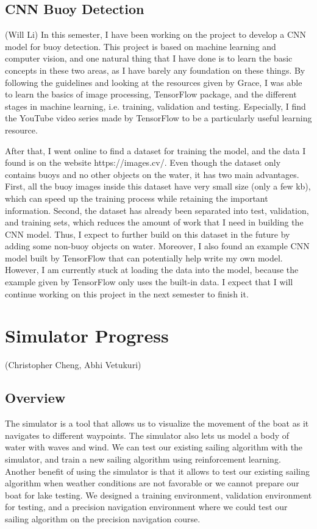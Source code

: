 \documentclass{article}
\begin{document}
\subsection{CNN Buoy Detection}
(Will Li)
\newline
In this semester, I have been working on the project to develop a CNN model for buoy detection. This project is based on machine learning and computer vision, and one natural thing that I have done is to learn the basic concepts in these two areas, as I have barely any foundation on these things. By following the guidelines and looking at the resources given by Grace, I was able to learn the basics of image processing, TensorFlow package, and the different stages in machine learning, i.e. training, validation and testing. Especially, I find the YouTube video series made by TensorFlow to be a particularly useful learning resource.

After that, I went online to find a dataset for training the model, and the data I found is on the website https://images.cv/. Even though the dataset only contains buoys and no other objects on the water, it has two main advantages. First, all the buoy images inside this dataset have very small size (only a few kb), which can speed up the training process while retaining the important information. Second, the dataset has already been separated into test, validation, and training sets, which reduces the amount of work that I need in building the CNN model. Thus, I expect to further build on this dataset in the future by adding some non-buoy objects on water. Moreover, I also found an example CNN model built by TensorFlow that can potentially help write my own model. However, I am currently stuck at loading the data into the model, because the example given by TensorFlow only uses the built-in data. I expect that I will continue working on this project in the next semester to finish it. 

\section{Simulator Progress}
(Christopher Cheng, Abhi Vetukuri)
\newline
\subsection{Overview}
The simulator is a tool that allows us to visualize the movement of the boat as it navigates to different waypoints. The simulator also lets us model a body of water with waves and wind. We can test our existing sailing algorithm with the simulator, and train a new sailing algorithm using reinforcement learning. Another benefit of using the simulator is that it allows to test our existing sailing algorithm when weather conditions are not favorable or we cannot prepare our boat for lake testing. We designed a training environment, validation environment for testing, and a precision navigation environment where we could test our sailing algorithm on the precision navigation course. 
\end{document}
